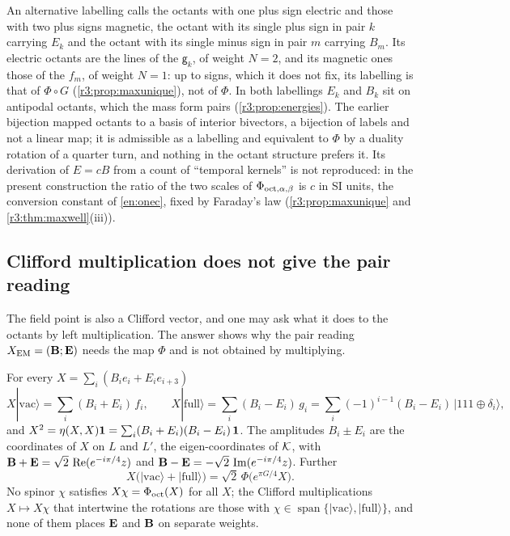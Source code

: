 \begin{remark}
\label{r3:rem:bijection}
An alternative labelling calls the octants with one plus sign electric and those with two plus signs magnetic, the octant with its single
plus sign in pair $k$ carrying $E_k$ and the octant with its single minus sign in pair $m$ carrying $B_m$. Its electric octants are
the lines of the $\mathsf g_k$, of weight $N=2$, and its magnetic ones those of the $f_m$, of weight $N=1$: up to signs, which it does not fix, its
labelling is that of $\Phi\circ G$ (\cref{r3:prop:maxunique}), not of $\Phi$. In both labellings $E_k$ and $B_k$ sit on antipodal octants,
which the mass form pairs (\cref{r3:prop:energies}). The earlier bijection mapped octants to a basis of interior bivectors, a bijection of labels
and not a linear map; it is admissible as a labelling and equivalent to $\Phi$ by a duality rotation of a quarter turn, and nothing in the
octant structure prefers it. Its derivation of $E=cB$ from a count of ``temporal kernels'' is not reproduced: in the present construction the
ratio of the two scales of $\Phi_{{\rm oct},\alpha,\beta}$ is $c$ in SI units, the conversion constant of \cref{en:onec}, fixed by Faraday's
law (\cref{r3:prop:maxunique} and \cref{r3:thm:maxwell}(iii)).
\end{remark}

\subsection{Clifford multiplication does not give the pair reading}
\label{r3:sec:poles}

The field point is also a Clifford vector, and one may ask what it does to the octants by left multiplication. The answer shows why the
pair reading $X_{\rm EM}=(\mathbf B;\mathbf E)$ needs the map $\Phi$ and is not obtained by multiplying.

\begin{proposition}
\label{r3:prop:poles}
For every $X=\sum_i(B_ie_i+E_ie_{i+3})$
\begin{equation}
\label{r3:eq:poles}
X|\mathrm{vac}\rangle=\sum_i(B_i+E_i)\,f_i,\qquad X|\mathrm{full}\rangle=\sum_i(B_i-E_i)\,g_i=\sum_i(-1)^{i-1}(B_i-E_i)\,|111\oplus\delta_i\rangle ,
\end{equation}
and $X^2=\eta(X,X)\mathbf 1=\sum_i(B_i+E_i)(B_i-E_i)\,\mathbf 1$. The amplitudes $B_i\pm E_i$ are the coordinates of $X$ on $L$ and $L'$, the eigen-coordinates of
$\mathcal K$, with $\mathbf B+\mathbf E=\sqrt2\,\operatorname{Re}(e^{-i\pi/4}z)$ and $\mathbf B-\mathbf E=-\sqrt2\,\operatorname{Im}(e^{-i\pi/4}z)$. Further
\begin{equation}
\label{r3:eq:eighth}
X\bigl(|\mathrm{vac}\rangle+|\mathrm{full}\rangle\bigr)=\sqrt2\,\Phi\bigl(e^{\pi G/4}X\bigr).
\end{equation}
No spinor $\chi$ satisfies $X\chi=\Phi_{\rm oct}(X)$ for all $X$; the Clifford multiplications $X\mapsto X\chi$ that intertwine the rotations are those with
$\chi\in\operatorname{span}\{|\mathrm{vac}\rangle,|\mathrm{full}\rangle\}$, and none of them places $\mathbf E$ and $\mathbf B$ on separate weights.
\end{proposition}


